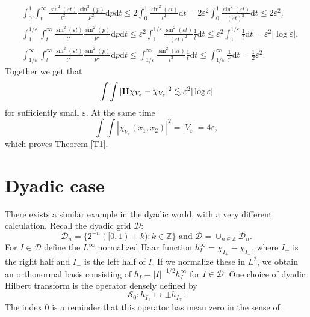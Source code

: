 \documentclass{article}
\newcommand{\infixand}{\text{ and }}
\newcommand{\mathd}{\mathrm{d}}
\def\H{{\bf H}}
\begin{document}
	\begin{align*}
		&\int^1_0 \int^{\infty}_t \frac{\sin^2 (\varepsilon t)}{t^2} \frac{\sin^2
			(p)}{p^2} \mathd p \mathd t \leqslant 2 \int^1_0 \frac{\sin^2 (\varepsilon
			t)}{t^2} \mathd t
		= 2 \varepsilon^2 \int^1_0 \frac{\sin^2 (\varepsilon
			t)}{(\varepsilon t)^2} \mathd t \leqslant 2 \varepsilon^2 . \\
		& \int^{1 / \varepsilon}_1 \int^{\infty}_t \frac{\sin^2 (\varepsilon t)}{t^2}
		\frac{\sin^2 (p)}{p^2} \mathd p \mathd t
		\leqslant \varepsilon^2 \int^{1 /
			\varepsilon}_1 \frac{\sin^2 (\varepsilon t)}{(\varepsilon t)^2} \frac{1}{t}
		\mathd t \leqslant \varepsilon^2 \int^{1 / \varepsilon}_1 \frac{1}{t}
		\mathd t = \varepsilon^2 | \log \varepsilon | . \\
		& \int^{\infty}_{1 / \varepsilon} \int^{\infty}_t \frac{\sin^2 (\varepsilon
			t)}{t^2} \frac{\sin^2 (p)}{p^2} \mathd p \mathd t \leqslant
		\int^{\infty}_{1 / \varepsilon} \frac{\sin^2 (\varepsilon t)}{t^2}
		\frac{1}{t} \mathd t \leqslant \int^{\infty}_{1 / \varepsilon}
		\frac{1}{t^3} \mathd t
		= \frac{1}{2} \varepsilon^2 .
	\end{align*}
	Together we get that
	\[ \int \int | \H \chi_{V_{\varepsilon}} -
	\chi_{V_{\varepsilon}} |^2 \lesssim \varepsilon^2 | \log \varepsilon | \]
	for sufficiently small $\varepsilon$. At the same time
	\[ \int \int | \chi_{V_{\varepsilon}} (x_1, x_2) |^2 = | V_{\varepsilon} | =
	4\varepsilon , \]
	which proves Theorem \ref{T1}.

	\section{Dyadic case}

	There exists a similar example in the dyadic world, with a very different
	calculation. Recall the dyadic grid $\mathcal{D}$:
	\[ \mathcal{D}_n = \{ 2^{- n} ([0, 1) + k) : k \in \mathbb{Z} \} \infixand
	\mathcal{D}= \cup_{n \in \mathbb{Z}} \mathcal{D}_n . \]
	For $I \in \mathcal{D}$ define the $L^{\infty}$ normalized Haar function
	$h^{\infty}_I = \chi_{I_+} - \chi_{I_-}$, where $I_+$ is the right half and
	$I_-$ is the left half of $I$. If we normalize these in $L^2$, we obtain an
	orthonormal basis consisting of $h_I = | I |^{- 1 / 2} h^{\infty}_I$ for $I
	\in \mathcal{D}$. One choice of dyadic Hilbert transform is the operator
	densely defined by
	\[ \mathcal{S}_0 : h_{I_{\pm}} \mapsto \pm h_{I_{\mp}} . \]
	The index $0$ is a reminder that this operator has mean zero in the sense of
	\cite{Pe}.
\end{document}
